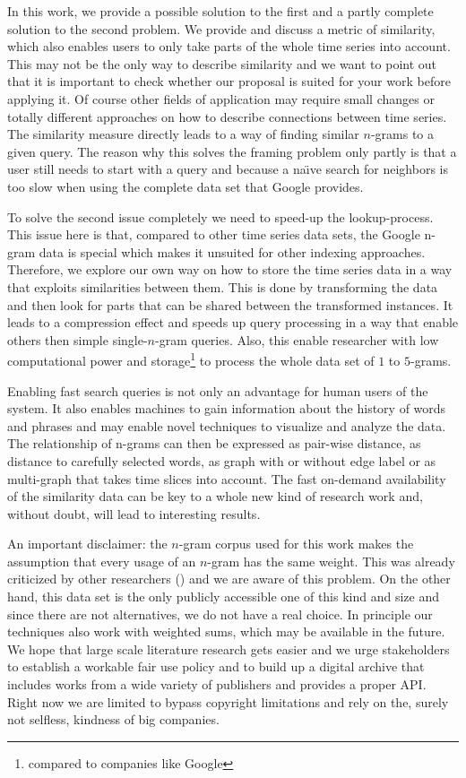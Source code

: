 In this work, we provide a possible solution to the first and a partly complete solution to the second problem. We provide and discuss a metric of similarity, which also enables users to only take parts of the whole time series into account. This may not be the only way to describe similarity and we want to point out that it is important to check whether our proposal is suited for your work before applying it. Of course other fields of application may require small changes or totally different approaches on how to describe connections between time series. The similarity measure directly leads to a way of finding similar $n$-grams to a given query. The reason why this solves the framing problem only partly is that a user still needs to start with a query and because a na{\"\i}ve search for neighbors is too slow when using the complete data set that Google provides.

To solve the second issue completely we need to speed-up the lookup-process. This issue here is that, compared to other time series data sets, the Google n-gram data is special which makes it unsuited for other indexing approaches. Therefore, we explore our own way on how to store the time series data in a way that exploits similarities between them. This is done by transforming the data and then look for parts that can be shared between the transformed instances. It leads to a compression effect and speeds up query processing in a way that enable others then simple single-$n$-gram queries. Also, this enable researcher with low computational power and storage\footnote{compared to companies like Google} to process the whole data set of $1$ to $5$-grams.

Enabling fast search queries is not only an advantage for human users of the system. It also enables machines to gain information about the history of words and phrases and may enable novel techniques to visualize and analyze the data. The relationship of n-grams can then be expressed as pair-wise distance, as distance to carefully selected words, as graph with or without edge label or as multi-graph that takes time slices into account. The fast on-demand availability of the similarity data can be key to a whole new kind of research work and, without doubt, will lead to interesting results.

An important disclaimer: the $n$-gram corpus used for this work makes the assumption that every usage of an $n$-gram has the same weight. This was already criticized by other researchers (\cite{countbad}) and we are aware of this problem. On the other hand, this data set is the only publicly accessible one of this kind and size and since there are not alternatives, we do not have a real choice. In principle our techniques also work with weighted sums, which may be available in the future. We hope that large scale literature research gets easier and we urge stakeholders to establish a workable fair use policy and to build up a digital archive that includes works from a wide variety of publishers and provides a proper API\@. Right now we are limited to bypass copyright limitations and rely on the, surely not selfless, kindness of big companies.

